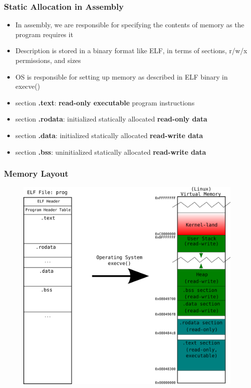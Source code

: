 \documentclass[11pt,xcolor=dvipsnames]{beamer}
\newcommand{\vs}{\vspace{0.5em}}
\newcommand{\mvs}{\vspace{-0.95em}}
\begin{document}
\begin{frame}[fragile,t]
\frametitle{Static Allocation in Assembly}
\begin{itemize}
  \item In assembly, we are responsible for specifying the contents of memory as the program requires it
  \item Description is stored in a binary format like ELF, in terms of sections, r/w/x permissions, and sizes
  \item OS is responsible for setting up memory as described in ELF binary in {\ttfamily execve()}
  \pause
  \vs\vs\vs
  \item {\ttfamily section \textbf{.text}}: \textbf{read-only executable} program instructions
  \item {\ttfamily section \textbf{.rodata}}: initialized statically allocated \textbf{read-only data}
  \item {\ttfamily section \textbf{.data}}: initialized statically allocated \textbf{read-write data}
  \item {\ttfamily section \textbf{.bss}}: uninitialized statically allocated \textbf{read-write data}
\end{itemize}
\end{frame}

\begin{frame}[fragile,t]
\frametitle{Memory Layout}
\mvs
\begin{figure}
\centering
\includegraphics[height=0.75\paperheight]{figures/memlayout.png}
\end{figure}
\end{frame}
\end{document}
